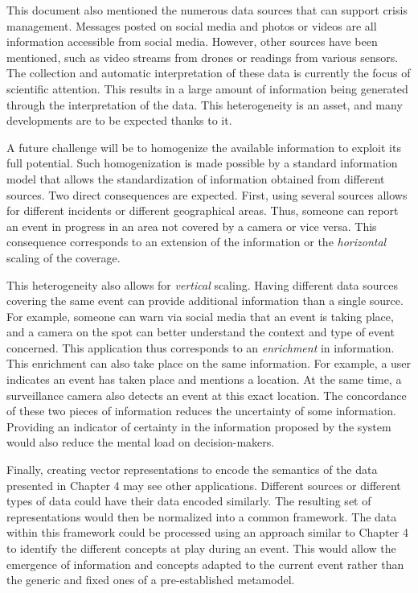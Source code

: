 This document also mentioned the numerous data sources that can support crisis management.
Messages posted on social media and photos or videos are all information accessible from social media.
However, other sources have been mentioned, such as video streams from drones or readings from various sensors.
The collection and automatic interpretation of these data is currently the focus of scientific attention.
This results in a large amount of information being generated through the interpretation of the data.
This heterogeneity is an asset, and many developments are to be expected thanks to it.

A future challenge will be to homogenize the available information to exploit its full potential.
Such homogenization is made possible by a standard information model that allows the standardization of information obtained from different sources.
Two direct consequences are expected.
First, using several sources allows for different incidents or different geographical areas.
Thus, someone can report an event in progress in an area not covered by a camera or vice versa.
This consequence corresponds to an extension of the information or the \emph{horizontal} scaling of the coverage.

This heterogeneity also allows for \emph{vertical} scaling.
Having different data sources covering the same event can provide additional information than a single source.
For example, someone can warn via social media that an event is taking place, and a camera on the spot can better understand the context and type of event concerned.
This application thus corresponds to an \emph{enrichment} in information.
This enrichment can also take place on the same information.
For example, a user indicates an event has taken place and mentions a location.
At the same time, a surveillance camera also detects an event at this exact location.
The concordance of these two pieces of information reduces the uncertainty of some information.
Providing an indicator of certainty in the information proposed by the system would also reduce the mental load on decision-makers.

Finally, creating vector representations to encode the semantics of the data presented in Chapter 4 may see other applications.
Different sources or different types of data could have their data encoded similarly.
The resulting set of representations would then be normalized into a common framework.
The data within this framework could be processed using an approach similar to Chapter 4 to identify the different concepts at play during an event.
This would allow the emergence of information and concepts adapted to the current event rather than the generic and fixed ones of a pre-established metamodel.


